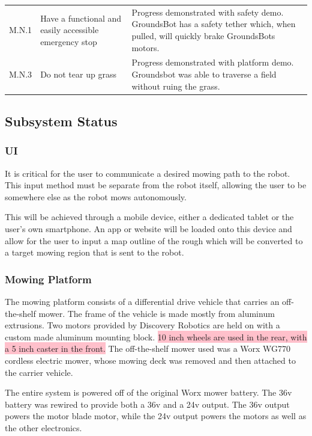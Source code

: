 \documentclass[12pt]{extarticle}
\begin{document}
\begin{center}
\begin{table}[H]
\begin{tabularx}{\textwidth}{ lXX }
    M.N.1 & Have a functional and easily accessible emergency stop & Progress demonstrated with safety demo. GroundsBot has a safety tether which, when pulled, will quickly brake GroundsBots motors. \\
    
    M.N.3 & Do not tear up grass & Progress demonstrated with platform demo. Groundsbot was able to traverse a field without ruing the grass. \\
    
	\end{tabularx}
  \end{table}
\end{center}
  
  \subsection{Subsystem Status}
   	\subsubsection{UI}
  	It is critical for the user to communicate a desired mowing path to the robot. This input method must be separate from the robot itself, allowing the user to be somewhere else as the robot mows autonomously. 
  
  	This will be achieved through a mobile device, either a dedicated tablet or the user's own smartphone. An app or website will be loaded onto this device and allow for the user to input a map outline of the rough which will be converted to a target mowing region that is sent to the robot.
  
 	\subsubsection{Mowing Platform}
  		The mowing platform consists of a differential drive vehicle that carries an off-the-shelf mower. The frame of the vehicle is made mostly from aluminum extrusions. Two motors provided by Discovery Robotics are held on with a custom made aluminum mounting block. \colorbox{pink}{10 inch wheels are used in the rear, with a 5 inch caster in the front.} The off-the-shelf mower used was a Worx WG770 cordless electric mower, whose mowing deck was removed and then attached to the carrier vehicle.
    
  	  The entire system is powered off of the original Worx mower battery. The 36v battery was rewired to provide both a 36v and a 24v output. The 36v output powers the motor blade motor, while the 24v output powers the  motors as well as the other electronics.
    
\end{document}

